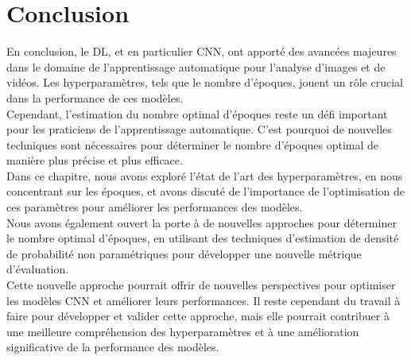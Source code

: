 \section{Conclusion}
En conclusion, le DL, et en particulier CNN, ont apporté des avancées majeures dans le domaine de l'apprentissage automatique pour l'analyse d'images et de vidéos. Les hyperparamètres, tels que le nombre d'époques, jouent un rôle crucial dans la performance de ces modèles.\\
Cependant, l'estimation du nombre optimal d'époques reste un défi important pour les praticiens de l'apprentissage automatique. C'est pourquoi de nouvelles techniques sont nécessaires pour déterminer le nombre d'époques optimal de manière plus précise et plus efficace.\\
Dans ce chapitre, nous avons exploré l'état de l'art des hyperparamètres, en nous concentrant sur les époques, et avons discuté de l'importance de l'optimisation de ces paramètres pour améliorer les performances des modèles.\\
Nous avons également ouvert la porte à de nouvelles approches pour déterminer le nombre optimal d'époques, en utilisant des techniques d'estimation de densité de probabilité non paramétriques pour développer une nouvelle métrique d'évaluation.\\
Cette nouvelle approche pourrait offrir de nouvelles perspectives pour optimiser les modèles CNN et améliorer leurs performances. Il reste cependant du travail à faire pour développer et valider cette approche, mais elle pourrait contribuer à une meilleure compréhension des hyperparamètres et à une amélioration significative de la performance des modèles.
